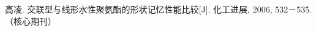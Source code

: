 \begin{publications}{99}

    \item{高凌}. {交联型与线形水性聚氨酯的形状记忆性能比较}[J].
    化工进展, 2006, 532－535.（核心期刊）

\end{publications}
